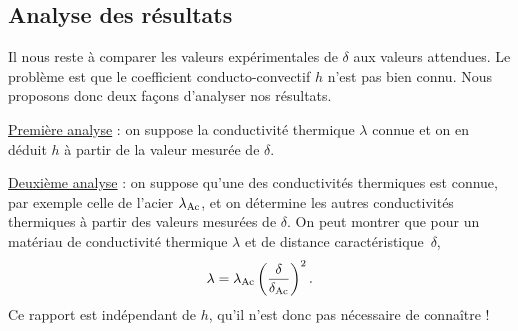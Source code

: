 %

\subsection{Analyse des résultats}
Il nous reste à comparer les valeurs expérimentales de $\delta$ aux valeurs attendues.
Le problème est que le coefficient conducto-convectif $h$ n’est pas bien connu. Nous proposons donc deux façons d’analyser nos résultats.

\underline{Première analyse} : on suppose la conductivité thermique $\lambda$ connue et on en déduit $h$ à partir de la valeur mesurée de $\delta$.
\begin{quest}
\end{quest}

\underline{Deuxième analyse} : on suppose qu’une des conductivités thermiques est connue, par exemple celle de l'acier $\lambda_{\rm Ac}$, et on détermine les autres conductivités thermiques à partir des valeurs mesurées de $\delta$. On peut montrer que pour un matériau de conductivité thermique $\lambda$ et de distance caractéristique~$\delta$, 
\begin{equation}
\lambda = \lambda_{\rm Ac} \left(\frac{\delta}{\delta_{\rm Ac} }\right)^2.
\end{equation}
Ce rapport est indépendant de $h$, qu’il n’est donc pas nécessaire de connaître !

\begin{quest}
\end{quest}


